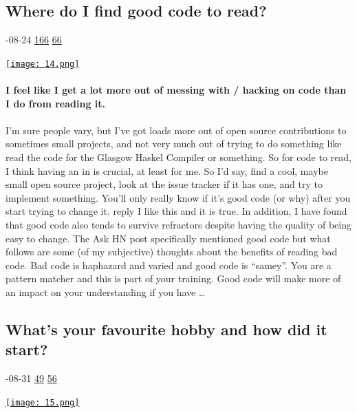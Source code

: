 \documentclass[10pt,a4paper]{article}
\begin{document}
\begin{multicols}{2}
\begin{minipage}{\linewidth}
\subsection{Where do I find good code to read?}
\textsc{\footnotesize
{\scriptsize\faCalendar}-08-24 
{\scriptsize\faThumbsOUp}\space 
\href{}{166} 
{\scriptsize\faComments}\space 
\href{}{66} 
}
\par\medskip\noindent
\href{https://news.ycombinator.com/item?id=37248002\&utm\_source=hackernewsletter\&utm\_medium=email\&utm\_term=ask\_hn}{
    \texttt{[image: 14.png]}
}
\end{minipage}
\paragraph{}
\textbf{I feel like I get a lot more out of messing with / hacking on code than I do from reading it.}
\paragraph{}
 I'm sure people vary, but I've got loads more out of open source contributions to sometimes small projects, and not very much out of trying to do something like read the code for the Glasgow Haskel Compiler or something.
So for code to read, I think having an in is crucial, at least for me. So I'd say, find a cool, maybe small open source project, look at the issue tracker if it has one, and try to implement something. You'll only really know if it's good code (or why) after you start trying to change it.
reply
I like this and it is true. In addition, I have found that good code also tends to survive refractors despite having the quality of being easy to change.
The Ask HN post specifically mentioned good code but what follows are some (of my subjective) thoughts about the benefits of reading bad code. Bad code is haphazard and varied and good code is “samey”. You are a pattern matcher and this is part of your training. Good code will make more of an impact on your understanding if you have 
\dots\par
\noindent\begin{minipage}{\linewidth}
\medskip
\subsection{What's your favourite hobby and how did it start?}
\textsc{\footnotesize
{\scriptsize\faCalendar}-08-31 
{\scriptsize\faThumbsOUp}\space 
\href{}{49} 
{\scriptsize\faComments}\space 
\href{}{56} 
}
\par\medskip\noindent
\href{https://news.ycombinator.com/item?id=37342013\&utm\_source=hackernewsletter\&utm\_medium=email\&utm\_term=ask\_hn}{
    \texttt{[image: 15.png]}
}
\end{minipage}

\end{multicols}
\end{document}
